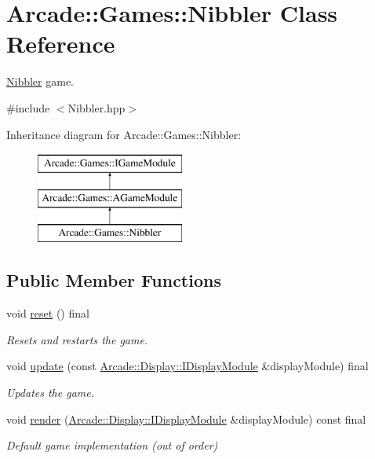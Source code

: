 \hypertarget{classArcade_1_1Games_1_1Nibbler}{}\section{Arcade\+::Games\+::Nibbler Class Reference}
\label{classArcade_1_1Games_1_1Nibbler}


\mbox{\hyperlink{classArcade_1_1Games_1_1Nibbler}{Nibbler}} game.  




{\ttfamily \#include $<$Nibbler.\+hpp$>$}

Inheritance diagram for Arcade\+::Games\+::Nibbler\+:\begin{figure}[H]
\begin{center}
\leavevmode
\includegraphics[height=3.000000cm]{classArcade_1_1Games_1_1Nibbler}
\end{center}
\end{figure}
\subsection*{Public Member Functions}
\begin{DoxyCompactItemize}
\item 
\mbox{\label{classArcade_1_1Games_1_1Nibbler_ab07050c302d764a32e42db43664e4687}} 
void \mbox{\hyperlink{classArcade_1_1Games_1_1Nibbler_ab07050c302d764a32e42db43664e4687}{reset}} () final
\begin{DoxyCompactList}\small\item\em Resets and restarts the game. \end{DoxyCompactList}\item 
void \mbox{\hyperlink{classArcade_1_1Games_1_1Nibbler_a6a44a75ab1905647587d7a6314155955}{update}} (const \mbox{\hyperlink{classArcade_1_1Display_1_1IDisplayModule}{Arcade\+::\+Display\+::\+I\+Display\+Module}} \&display\+Module) final
\begin{DoxyCompactList}\small\item\em Updates the game. \end{DoxyCompactList}\item 
void \mbox{\hyperlink{classArcade_1_1Games_1_1Nibbler_afd52ee2fad66523b58f94f9eb582145e}{render}} (\mbox{\hyperlink{classArcade_1_1Display_1_1IDisplayModule}{Arcade\+::\+Display\+::\+I\+Display\+Module}} \&display\+Module) const final
\begin{DoxyCompactList}\small\item\em Default game implementation (out of order) \end{DoxyCompactList}\end{DoxyCompactItemize}
